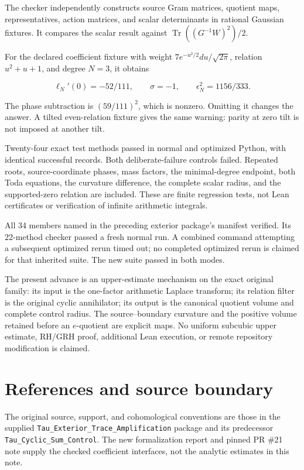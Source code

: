 \documentclass[
  11pt,
]{article}
\begin{document}
The checker independently constructs source Gram matrices, quotient
maps, representatives, action matrices, and scalar determinants in
rational Gaussian fixtures. It compares the scalar result against
\(\operatorname{Tr}((G^{-1}W)^2)/2\).

For the declared coefficient fixture with weight
\(7e^{-u^2/2}du/\sqrt{2\pi}\), relation \(u^2+u+1\), and degree \(N=3\),
it obtains

\[
\ell_N'(0)=-52/111,\qquad \sigma=-1,\qquad
\epsilon_N^2=1156/333.
\]

The phase subtraction is \((59/111)^2\), which is nonzero. Omitting it
changes the answer. A tilted even-relation fixture gives the same
warning: parity at zero tilt is not imposed at another tilt.

Twenty-four exact test methods passed in normal and optimized Python,
with identical successful records. Both deliberate-failure controls
failed. Repeated roots, source-coordinate phases, mass factors, the
minimal-degree endpoint, both Toda equations, the curvature difference,
the complete scalar radius, and the supported-zero relation are
included. These are finite regression tests, not Lean certificates or
verification of infinite arithmetic integrals.

All 34 members named in the preceding exterior package's manifest
verified. Its 22-method checker passed a fresh normal run. A combined
command attempting a subsequent optimized rerun timed out; no completed
optimized rerun is claimed for that inherited suite. The new suite
passed in both modes.

The present advance is an upper-estimate mechanism on the exact original
family: its input is the one-factor arithmetic Laplace transform; its
relation filter is the original cyclic annihilator; its output is the
canonical quotient volume and complete control radius. The
source--boundary curvature and the positive volume retained before an
\(e\)-quotient are explicit maps. No uniform subcubic upper estimate,
RH/GRH proof, additional Lean execution, or remote repository
modification is claimed.

\section{References and source
boundary}\label{references-and-source-boundary}

The original source, support, and cohomological conventions are those in
the supplied \texttt{Tau\_Exterior\_Trace\_Amplification} package and
its predecessor \texttt{Tau\_Cyclic\_Sum\_Control}. The new
formalization report and pinned PR \#21 note supply the checked
coefficient interfaces, not the analytic estimates in this note.
\end{document}
